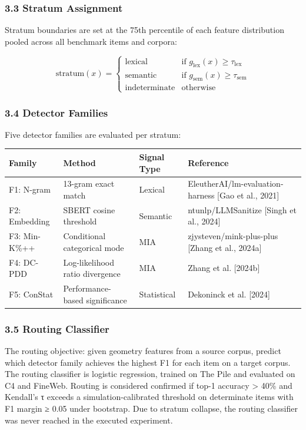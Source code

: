 \subsubsection{3.3 Stratum Assignment}

Stratum boundaries are set at the 75th percentile of each feature distribution pooled across all benchmark items and corpora:

$$\text{stratum}(x) = \begin{cases} \text{lexical} & \text{if } g_{\text{lex}}(x) \geq \tau_{\text{lex}} \\ \text{semantic} & \text{if } g_{\text{sem}}(x) \geq \tau_{\text{sem}} \\ \text{indeterminate} & \text{otherwise} \end{cases}$$

\subsubsection{3.4 Detector Families}

Five detector families are evaluated per stratum:

\begin{table}[htbp]
\centering
\begin{tabular}{llll}
\toprule
Family & Method & Signal Type & Reference \\
\midrule
F1: N-gram & 13-gram exact match & Lexical & EleutherAI/lm-evaluation-harness [Gao et al., 2021] \\
F2: Embedding & SBERT cosine threshold & Semantic & ntunlp/LLMSanitize [Singh et al., 2024] \\
F3: Min-K\%++ & Conditional categorical mode & MIA & zjysteven/mink-plus-plus [Zhang et al., 2024a] \\
F4: DC-PDD & Log-likelihood ratio divergence & MIA & Zhang et al. [2024b] \\
F5: ConStat & Performance-based significance & Statistical & Dekoninck et al. [2024] \\
\bottomrule
\end{tabular}
\end{table}

\subsubsection{3.5 Routing Classifier}

The routing objective: given geometry features from a source corpus, predict which detector family achieves the highest F1 for each item on a target corpus. The routing classifier is logistic regression, trained on The Pile and evaluated on C4 and FineWeb. Routing is considered confirmed if top-1 accuracy > 40\% and Kendall's τ exceeds a simulation-calibrated threshold on determinate items with F1 margin ≥ 0.05 under bootstrap. Due to stratum collapse, the routing classifier was never reached in the executed experiment.

